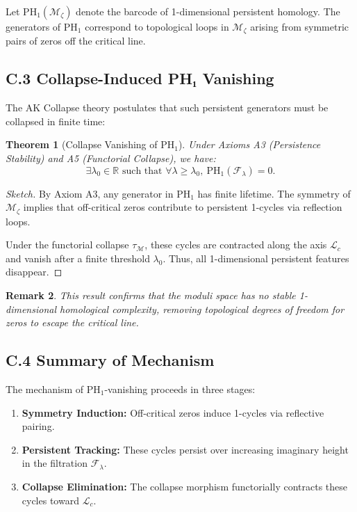 \documentclass[11pt]{article}
\newtheorem{theorem}{Theorem}[section]
\newtheorem{remark}[theorem]{Remark}
\begin{document}
Let $\mathrm{PH}_1(\mathcal{M}_\zeta)$ denote the barcode of 1-dimensional persistent homology.  
The generators of $\mathrm{PH}_1$ correspond to topological loops in $\mathcal{M}_\zeta$ arising from symmetric pairs of zeros  
off the critical line.

\subsection*{C.3 Collapse-Induced PH₁ Vanishing}

The AK Collapse theory postulates that such persistent generators must be collapsed in finite time:

\begin{theorem}[Collapse Vanishing of PH$_1$]
Under Axioms A3 (Persistence Stability) and A5 (Functorial Collapse), we have:
\[
\exists \lambda_0 \in \mathbb{R} \text{ such that } \forall \lambda \geq \lambda_0,\ \mathrm{PH}_1(\mathcal{F}_\lambda) = 0.
\]
\end{theorem}

\begin{proof}[Sketch]
By Axiom A3, any generator in $\mathrm{PH}_1$ has finite lifetime.  
The symmetry of $\mathcal{M}_\zeta$ implies that off-critical zeros contribute to persistent 1-cycles via reflection loops.

Under the functorial collapse $\tau_{\mathcal{M}}$, these cycles are contracted along the axis $\mathcal{L}_c$  
and vanish after a finite threshold $\lambda_0$.  
Thus, all 1-dimensional persistent features disappear.
\end{proof}

\begin{remark}
This result confirms that the moduli space has no stable 1-dimensional homological complexity,  
removing topological degrees of freedom for zeros to escape the critical line.
\end{remark}

\subsection*{C.4 Summary of Mechanism}

The mechanism of $\mathrm{PH}_1$-vanishing proceeds in three stages:

\begin{enumerate}
    \item \textbf{Symmetry Induction:} Off-critical zeros induce 1-cycles via reflective pairing.
    \item \textbf{Persistent Tracking:} These cycles persist over increasing imaginary height in the filtration $\mathcal{F}_\lambda$.
    \item \textbf{Collapse Elimination:} The collapse morphism functorially contracts these cycles toward $\mathcal{L}_c$.
\end{enumerate}
\end{document}
